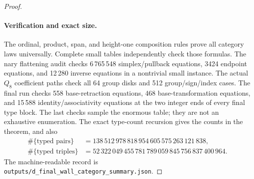 \begin{proof}
\paragraph{Verification and exact size.}
The ordinal, product, span, and height-one composition rules
prove all category laws universally. Complete small tables
independently check those formulas. The nary flattening audit
checks 6\,765\,548 simplex/pullback equations, 3424 endpoint
equations, and 12\,280 inverse equations in a nontrivial small
instance. The actual $Q_8$ coefficient paths check all 64 group
disks and 512 group/sign/index cases. The final run checks 558
base-retraction equations, 468 base-transformation equations,
and 15\,588 identity/associativity equations at the two integer
ends of every final type block. The last checks sample the
enormous table; they are not an exhaustive enumeration.
The exact type-count recursion gives the counts in the theorem,
and also
\[
\begin{split}
 \#\{\text{typed pairs}\}&=
 138\,512\,978\,818\,954\,605\,575\,263\,121\,838,\\
 \#\{\text{typed triples}\}&=
 52\,322\,049\,455\,781\,789\,059\,845\,756\,837\,400\,964.
\end{split}
\]
The machine-readable record is
\texttt{outputs/d\_final\_wall\_category\_summary.json}.
\end{proof}
